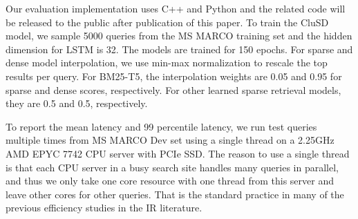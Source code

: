 Our evaluation implementation uses C++ and Python and the
related code will be released to the public after publication of this paper. 
To train the CluSD model, we sample 5000 queries from the MS MARCO training set 
and the hidden dimension for LSTM is 32. The models are trained for 150 epochs. 
For sparse and dense model interpolation, we use min-max normalization to rescale the top results per query. 
For  BM25-T5, the interpolation  weights are  0.05 and 0.95 for sparse  and  dense scores, respectively. 
For other learned sparse retrieval models, they are  0.5 and  0.5, respectively. 

To report the mean latency and 99 percentile latency, 
we  run test queries multiple times  from MS MARCO Dev set using a single thread on  a 2.25GHz AMD EPYC 7742  CPU server with PCIe SSD.
The reason to use a single thread is that each CPU server in a busy search site handles many queries in parallel, and thus we only take
one core resource with one thread from this server and leave other cores  for other queries.
That is the standard practice in many of the previous efficiency studies in the IR literature.


